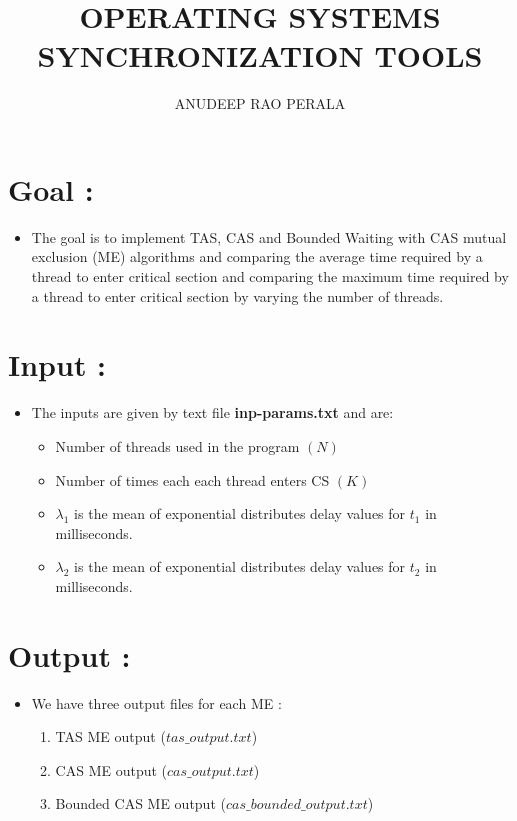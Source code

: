 \documentclass[12pt,a4paper]{article}
\title{OPERATING SYSTEMS \\ SYNCHRONIZATION TOOLS}
\author{ANUDEEP RAO PERALA }
\date{}
\begin{document}
	\maketitle
	
	\tableofcontents
	\newpage
	
	\section{Goal :}
	\begin{itemize}
		\item The goal is to implement TAS, CAS and Bounded Waiting with CAS mutual exclusion (ME) algorithms and comparing the average time required by a thread to enter critical section and comparing the maximum time required by a thread to enter critical section by varying the number of threads.
	\end{itemize}
	\section{Input :}
	\begin{itemize}
		\item The inputs are given by text file \textbf{inp-params.txt} and are:
		\begin{itemize}
			\item Number of threads used in the program $(N)$ 
			\item Number of times each each thread enters CS $(K)$
			\item $\lambda _1$ is the mean of exponential distributes delay values for $t_1$ in milliseconds.
			\item $\lambda _2$ is the mean of exponential distributes delay values for $t_2$ in milliseconds.
		\end{itemize}
	\end{itemize}
	\section{Output :}
	\begin{itemize}
		\item We have three output files for each ME :
		\begin{enumerate}
			\item TAS ME output ($tas\_output.txt$)
			\item CAS ME output ($cas\_output.txt$)
			\item Bounded CAS ME output ($cas\_bounded\_output.txt$)
		\end{enumerate}
	\end{itemize}
	
\end{document}
